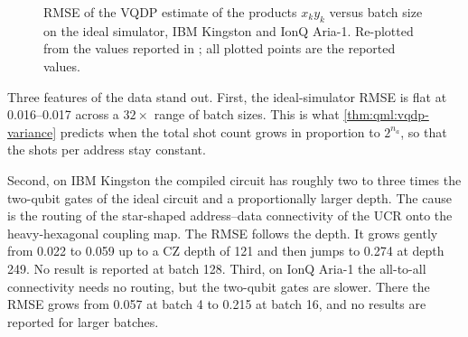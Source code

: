 \begin{figure}[htbp]
\centering
{}
\caption{RMSE of the VQDP estimate of the products $x_k y_k$ versus batch size on the ideal simulator, IBM Kingston and IonQ Aria-1. Re-plotted from the values reported in \cite{guo2025vqt}; all plotted points are the reported values.}\label{fig:qml:vqt-rmse}
\end{figure}

Three features of the data stand out. First, the ideal-simulator RMSE is flat at 0.016--0.017 across a $32\times$ range of batch sizes. This is what \cref{thm:qml:vqdp-variance} predicts when the total shot count grows in proportion to $2^{n_a}$, so that the shots per address stay constant.

Second, on IBM Kingston the compiled circuit has roughly two to three times the two-qubit gates of the ideal circuit and a proportionally larger depth. The cause is the routing of the star-shaped address--data connectivity of the UCR onto the heavy-hexagonal coupling map. The RMSE follows the depth. It grows gently from 0.022 to 0.059 up to a CZ depth of 121 and then jumps to 0.274 at depth 249. No result is reported at batch 128. Third, on IonQ Aria-1 the all-to-all connectivity needs no routing, but the two-qubit gates are slower. There the RMSE grows from 0.057 at batch 4 to 0.215 at batch 16, and no results are reported for larger batches.

